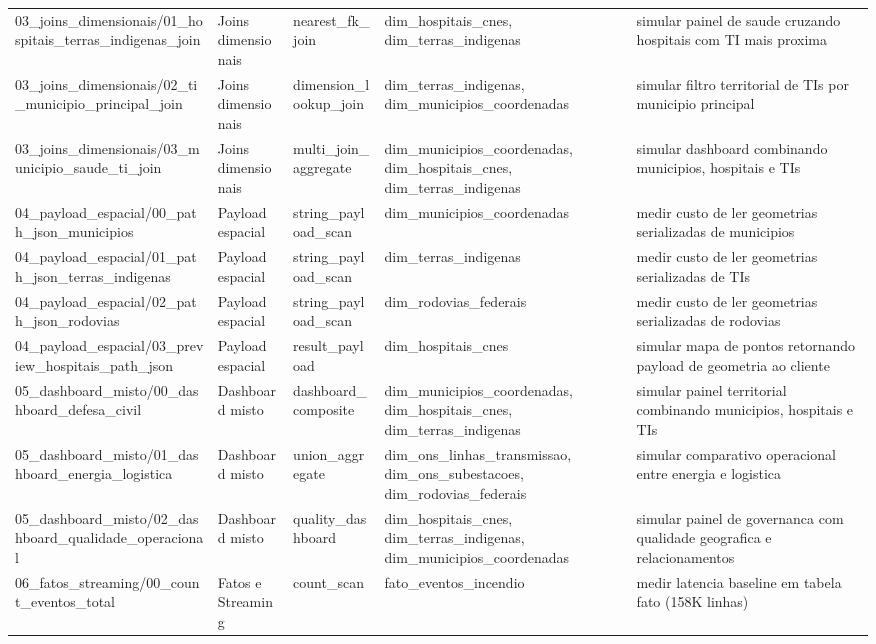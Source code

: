 \begin{landscape}
{\begin{longtable}{p{}p{}p{}p{}p{}}
03\_joins\_dimensionais/01\_hospitais\_terras\_indigenas\_join & Joins dimensionais & nearest\_fk\_join & dim\_hospitais\_cnes, dim\_terras\_indigenas & simular painel de saude cruzando hospitais com TI mais proxima \\
03\_joins\_dimensionais/02\_ti\_municipio\_principal\_join & Joins dimensionais & dimension\_lookup\_join & dim\_terras\_indigenas, dim\_municipios\_coordenadas & simular filtro territorial de TIs por municipio principal \\
03\_joins\_dimensionais/03\_municipio\_saude\_ti\_join & Joins dimensionais & multi\_join\_aggregate & dim\_municipios\_coordenadas, dim\_hospitais\_cnes, dim\_terras\_indigenas & simular dashboard combinando municipios, hospitais e TIs \\
04\_payload\_espacial/00\_path\_json\_municipios & Payload espacial & string\_payload\_scan & dim\_municipios\_coordenadas & medir custo de ler geometrias serializadas de municipios \\
04\_payload\_espacial/01\_path\_json\_terras\_indigenas & Payload espacial & string\_payload\_scan & dim\_terras\_indigenas & medir custo de ler geometrias serializadas de TIs \\
04\_payload\_espacial/02\_path\_json\_rodovias & Payload espacial & string\_payload\_scan & dim\_rodovias\_federais & medir custo de ler geometrias serializadas de rodovias \\
04\_payload\_espacial/03\_preview\_hospitais\_path\_json & Payload espacial & result\_payload & dim\_hospitais\_cnes & simular mapa de pontos retornando payload de geometria ao cliente \\
05\_dashboard\_misto/00\_dashboard\_defesa\_civil & Dashboard misto & dashboard\_composite & dim\_municipios\_coordenadas, dim\_hospitais\_cnes, dim\_terras\_indigenas & simular painel territorial combinando municipios, hospitais e TIs \\
05\_dashboard\_misto/01\_dashboard\_energia\_logistica & Dashboard misto & union\_aggregate & dim\_ons\_linhas\_transmissao, dim\_ons\_subestacoes, dim\_rodovias\_federais & simular comparativo operacional entre energia e logistica \\
05\_dashboard\_misto/02\_dashboard\_qualidade\_operacional & Dashboard misto & quality\_dashboard & dim\_hospitais\_cnes, dim\_terras\_indigenas, dim\_municipios\_coordenadas & simular painel de governanca com qualidade geografica e relacionamentos \\
06\_fatos\_streaming/00\_count\_eventos\_total & Fatos e Streaming & count\_scan & fato\_eventos\_incendio & medir latencia baseline em tabela fato (158K linhas) \\

\end{longtable}}
\end{landscape}
